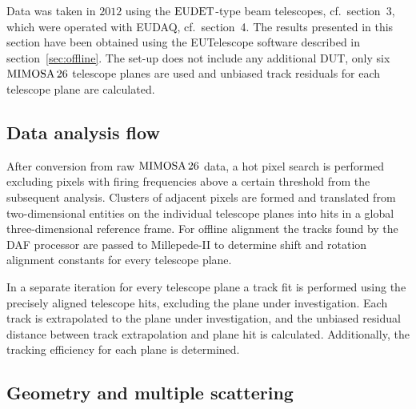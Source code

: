Data was taken in $2012$ using the $\textrm{EUDET}$-type beam telescopes, cf.~section~3, which were operated with EUDAQ, cf.~section~4. 
The results presented in this section have been obtained using the EUTelescope software described in section~\ref{sec:offline}.
The set-up does not include any additional DUT, only six $\textrm{MIMOSA\,26}$ telescope planes are used and unbiased track residuals for each telescope plane are calculated.

\subsection{Data analysis flow}
\label{sec:datura-nodut}

After conversion from raw $\textrm{MIMOSA\,26}$ data, a hot pixel search is performed excluding pixels with firing frequencies above a certain threshold from the subsequent analysis.
Clusters of adjacent pixels are formed and translated from two-dimensional entities on the individual telescope planes into hits in a global three-dimensional reference frame.
For offline alignment the tracks found by the DAF processor are passed to Millepede-II to determine shift and rotation alignment constants for every telescope plane.

In a separate iteration for every telescope plane a track fit is performed using the precisely aligned telescope hits, excluding the plane under investigation.
Each track is extrapolated to the plane under investigation, and the unbiased residual distance between track extrapolation and plane hit is calculated.
Additionally, the tracking efficiency for each plane is determined. 

\subsection{Geometry and multiple scattering}
\label{sec:multiplescattering}

